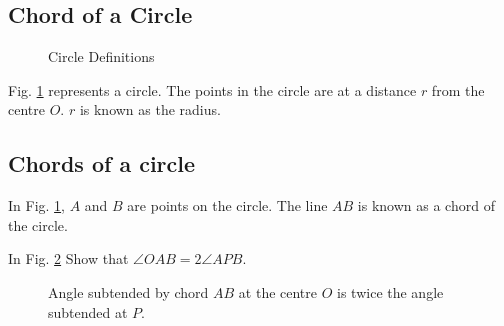 \subsection{Chord of a Circle}

\begin{figure}[!h]
	\begin{center}
		
		\resizebox{\columnwidth}{!}{}
	\end{center}
	\caption{Circle Definitions}
	\label{ch4_circle_def}	
\end{figure}
\begin{definition}
	Fig. \ref{ch4_circle_def} represents a circle.  The points in the circle are at a distance $r$ from the centre $O$.  $r$ is known as the radius.
\end{definition}

\subsection{Chords of a circle}
\begin{definition}
	In Fig. \ref{ch4_circle_def}, $A$ and $B$ are points on the circle.  The line $AB$ is known as a chord of the circle.
\end{definition}
%
%
\begin{problem}
	\label{ch4_prob_circle_subtend}
	In Fig. \ref{ch4_circle_subtend}  Show that $\angle OAB = 2\angle APB $.
\end{problem}
\begin{figure}[!h]
	\begin{center}
		
		\resizebox{\columnwidth}{!}{}
	\end{center}
	\caption{Angle subtended by chord $AB$ at the centre $O$ is twice the angle subtended at $P$. }
	\label{ch4_circle_subtend}	
\end{figure}

